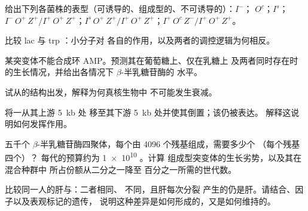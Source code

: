\begin{exercise}[$\star\star$]\label{exo:b1:expression-control:5}
给出下列各菌株的表型（可诱导的、组成型的、不可诱导的）：$I^-$；
$O^c$；$I^s$；$I^-\,O^+\,Z^+ / I^+\,O^+\,Z^+$；$I^s\,O^+\,Z^+ /
I^+\,O^+\,Z^+$；$I^+\,O^c\,Z^- / I^+\,O^+\,Z^+$。
\end{exercise}

\begin{exercise}[$\star\star$]\label{exo:b1:expression-control:6}
比较 lac 与 trp ：小分子对
各自的作用，以及两者的调控逻辑为何相反。
\end{exercise}

\begin{exercise}[$\star\star$]\label{exo:b1:expression-control:7}
某突变体不能合成环 AMP。预测其在葡萄糖上、仅在乳糖上
及两者同时存在时的生长情况，并给出各情况下 $\beta$-半乳糖苷酶的
水平。
\end{exercise}

\begin{exercise}[$\star\star$]\label{exo:b1:expression-control:8}
试从的结构出发，解释为何真核生物中
不可能发生衰减。
\end{exercise}

\begin{exercise}[$\star\star$]\label{exo:b1:expression-control:9}
将一从其上游 \qty{5}{kb} 处
移至其下游 \qty{5}{kb} 处并使其倒置；该仍被表达。
解释这说明如何发挥作用。
\end{exercise}

\begin{exercise}[$\star\star\star$]\label{exo:b1:expression-control:10}
五千个 $\beta$-半乳糖苷酶四聚体，每个由 \qty{4096}{}
个残基组成，需要多少个 （每个残基四个）？
每代的预算约为 \qty{1e10}{} 。计算
组成型突变体的生长劣势，以及其在混合种群中
所占份额从二分之一降至
百分之一所需的世代数。
\end{exercise}

\begin{exercise}[$\star\star\star$]\label{exo:b1:expression-control:11}
比较同一人的肝与：二者相同、
不同，且肝每次分裂
产生的仍是肝。请结合、因子以及表观标记的遗传，
说明这种差异是如何形成的，又是如何维持的。
\end{exercise}

